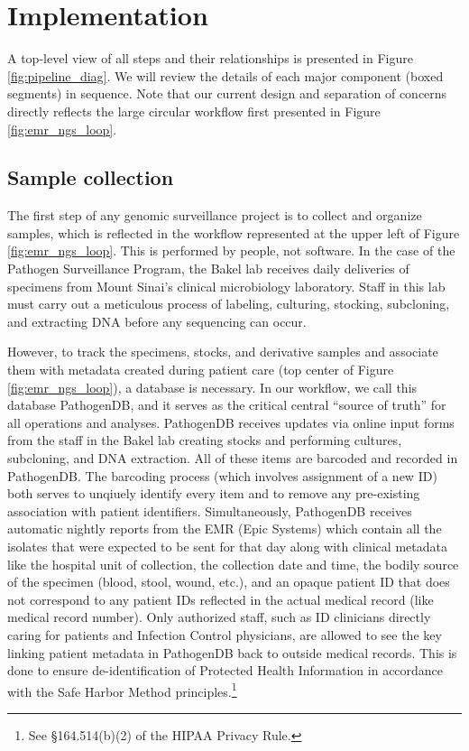 \section{Implementation}

A top-level view of all steps and their relationships is presented in Figure \ref{fig:pipeline_diag}. We will review the details of each major component (boxed segments) in sequence. Note that our current design and separation of concerns directly reflects the large circular workflow first presented in Figure \ref{fig:emr_ngs_loop}.

\subsection{Sample collection}

The first step of any genomic surveillance project is to collect and organize samples, which is reflected in the workflow represented at the upper left of Figure \ref{fig:emr_ngs_loop}. This is performed by people, not software. In the case of the Pathogen Surveillance Program, the Bakel lab receives daily deliveries of specimens from Mount Sinai's clinical microbiology laboratory. Staff in this lab must carry out a meticulous process of labeling, culturing, stocking, subcloning, and extracting DNA before any sequencing can occur.

However, to track the specimens, stocks, and derivative samples and associate them with metadata created during patient care (top center of Figure \ref{fig:emr_ngs_loop}), a database is necessary. In our workflow, we call this database PathogenDB, and it serves as the critical central ``source of truth'' for all operations and analyses. PathogenDB receives updates via online input forms from the staff in the Bakel lab creating stocks and performing cultures, subcloning, and DNA extraction. All of these items are barcoded and recorded in PathogenDB. The barcoding process (which involves assignment of a new ID) both serves to unqiuely identify every item and to remove any pre-existing association with patient identifiers. Simultaneously, PathogenDB receives automatic nightly reports from the EMR (Epic Systems) which contain all the isolates that were expected to be sent for that day along with clinical metadata like the hospital unit of collection, the collection date and time, the bodily source of the specimen (blood, stool, wound, etc.), and an opaque patient ID that does not correspond to any patient IDs reflected in the actual medical record (like medical record number). Only authorized staff, such as ID clinicians directly caring for patients and Infection Control physicians, are allowed to see the key linking patient metadata in PathogenDB back to outside medical records. This is done to ensure de-identification of Protected Health Information in accordance with the Safe Harbor Method principles.\footnote{See §164.514(b)(2) of the HIPAA Privacy Rule.}

